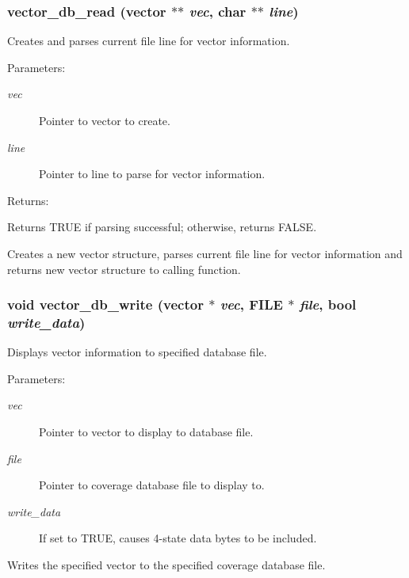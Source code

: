 \subsubsection{ vector\_\-db\_\-read ({\bf vector} $\ast$$\ast$ {\em vec}, char $\ast$$\ast$ {\em line})}\label{vector_8c_a11}


Creates and parses current file line for vector information.

\begin{Desc}
\item[Parameters: ]\par
\begin{description}
\item[{\em 
vec}]Pointer to vector to create. \item[{\em 
line}]Pointer to line to parse for vector information.\end{description}
\end{Desc}
\begin{Desc}
\item[Returns: ]\par
Returns TRUE if parsing successful; otherwise, returns FALSE.\end{Desc}
Creates a new vector structure, parses current file line for vector information and returns new vector structure to calling function. 
\subsubsection{\setlength{\rightskip}{0pt plus 5cm}void vector\_\-db\_\-write ({\bf vector} $\ast$ {\em vec}, FILE $\ast$ {\em file}, {\bf bool} {\em write\_\-data})}\label{vector_8c_a10}


Displays vector information to specified database file.

\begin{Desc}
\item[Parameters: ]\par
\begin{description}
\item[{\em 
vec}]Pointer to vector to display to database file. \item[{\em 
file}]Pointer to coverage database file to display to. \item[{\em 
write\_\-data}]If set to TRUE, causes 4-state data bytes to be included.\end{description}
\end{Desc}
Writes the specified vector to the specified coverage database file. 
